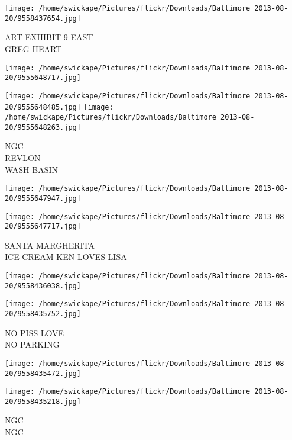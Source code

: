 \documentclass[10pt,letterpaper]{article}
\begin{document}
\vspace{0.25in}
\texttt{[image: /home/swickape/Pictures/flickr/Downloads/Baltimore 2013-08-20/9558437654.jpg]}

ART EXHIBIT 9 EAST\\
GREG HEART\\
\pagebreak

\texttt{[image: /home/swickape/Pictures/flickr/Downloads/Baltimore 2013-08-20/9555648717.jpg]}

\vspace{0.25in}
\texttt{[image: /home/swickape/Pictures/flickr/Downloads/Baltimore 2013-08-20/9555648485.jpg]}
\texttt{[image: /home/swickape/Pictures/flickr/Downloads/Baltimore 2013-08-20/9555648263.jpg]}

NGC\\
REVLON\\
WASH BASIN\\
\pagebreak

\texttt{[image: /home/swickape/Pictures/flickr/Downloads/Baltimore 2013-08-20/9555647947.jpg]}

\vspace{0.25in}
\texttt{[image: /home/swickape/Pictures/flickr/Downloads/Baltimore 2013-08-20/9555647717.jpg]}

SANTA MARGHERITA\\
ICE CREAM KEN LOVES LISA\\
\pagebreak

\texttt{[image: /home/swickape/Pictures/flickr/Downloads/Baltimore 2013-08-20/9558436038.jpg]}

\vspace{0.25in}
\texttt{[image: /home/swickape/Pictures/flickr/Downloads/Baltimore 2013-08-20/9558435752.jpg]}

NO PISS LOVE\\
NO PARKING\\
\pagebreak

\texttt{[image: /home/swickape/Pictures/flickr/Downloads/Baltimore 2013-08-20/9558435472.jpg]}

\vspace{0.25in}
\texttt{[image: /home/swickape/Pictures/flickr/Downloads/Baltimore 2013-08-20/9558435218.jpg]}

NGC\\
NGC\\
\pagebreak
\end{document}
